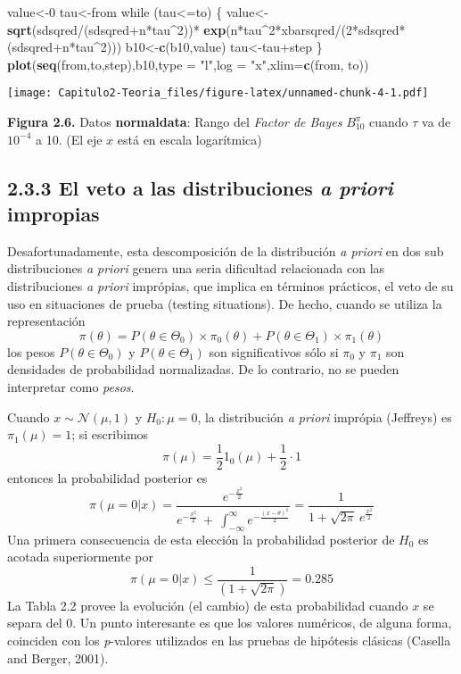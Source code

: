 \documentclass[12pt,]{article}
\newenvironment{Shaded}{\begin{snugshade}}{\end{snugshade}}
\newcommand{\KeywordTok}[1]{\textcolor[rgb]{0.13,0.29,0.53}{\textbf{{#1}}}}
\newcommand{\DataTypeTok}[1]{\textcolor[rgb]{0.13,0.29,0.53}{{#1}}}
\newcommand{\DecValTok}[1]{\textcolor[rgb]{0.00,0.00,0.81}{{#1}}}
\newcommand{\StringTok}[1]{\textcolor[rgb]{0.31,0.60,0.02}{{#1}}}
\newcommand{\NormalTok}[1]{{#1}}
\begin{document}
\begin{Shaded}
\begin{Highlighting}[]
\NormalTok{value<-}\DecValTok{0}
\NormalTok{tau<-from}
\NormalTok{while (tau<=to) \{}
  \NormalTok{value<-}\KeywordTok{sqrt}\NormalTok{(sdsqred/(sdsqred+n*tau^}\DecValTok{2}\NormalTok{))*}
\StringTok{    }\KeywordTok{exp}\NormalTok{(n*tau^}\DecValTok{2}\NormalTok{*xbarsqred/(}\DecValTok{2}\NormalTok{*sdsqred*(sdsqred+n*tau^}\DecValTok{2}\NormalTok{)))}
  \NormalTok{b10<-}\KeywordTok{c}\NormalTok{(b10,value)}
  \NormalTok{tau<-tau+step}
\NormalTok{\}}
\KeywordTok{plot}\NormalTok{(}\KeywordTok{seq}\NormalTok{(from,to,step),b10,}\DataTypeTok{type =} \StringTok{"l"}\NormalTok{,}\DataTypeTok{log =} \StringTok{"x"}\NormalTok{,}\DataTypeTok{xlim=}\KeywordTok{c}\NormalTok{(from, to))}
\end{Highlighting}
\end{Shaded}

\texttt{[image: Capitulo2-Teoria\_files/figure-latex/unnamed-chunk-4-1.pdf]}

\textbf{Figura 2.6.} Datos \textbf{normaldata}: Rango del \emph{Factor
de Bayes} \(B_{10}^\pi\) cuando \(\tau\) va de \(10^{-4}\) a 10. (El eje
\(x\) está en escala logarítmica)

\subsection{\texorpdfstring{2.3.3 El veto a las distribuciones \emph{a
priori}
impropias}{2.3.3 El veto a las distribuciones a priori impropias}}\label{el-veto-a-las-distribuciones-a-priori-impropias}

Desafortunadamente, esta descomposición de la distribución \emph{a
priori} en dos sub distribuciones \emph{a priori} genera una seria
dificultad relacionada con las distribuciones \emph{a priori} imprópias,
que implica en términos prácticos, el veto de su uso en situaciones de
prueba (testing situations). De hecho, cuando se utiliza la
representación \[
\pi(\theta)=P(\theta\in\Theta_0)\times\pi_0(\theta)+P(\theta\in\Theta_1)\times\pi_1(\theta)
\] los pesos \(P(\theta\in\Theta_0)\) y \(P(\theta\in\Theta_1)\) son
significativos sólo si \(\pi_0\) y \(\pi_1\) son densidades de
probabilidad normalizadas. De lo contrario, no se pueden interpretar
como \emph{pesos}.

Cuando \(x\sim\mathcal{N}(\mu,1)\) y \(H_0:\mu=0\), la distribución
\emph{a priori} imprópia (Jeffreys) es \(\pi_1(\mu)=1\); si escribimos
\[
\pi(\mu)=\frac{1}{2} 1_{0}(\mu)+\frac{1}{2} \cdotp 1
\] entonces la probabilidad posterior es \[
\pi(\mu=0|x)=  \frac{\displaystyle e^{-\frac{x^2}{2}}}{e^{-\frac{x^2}{2}}\ +\ \displaystyle \int_{-\infty}^{\infty}e^{-\frac{(x-\theta)^2}{2}}}=\frac{1}{1+\sqrt{2\pi}\ e^{\frac{x^2}{2}}}
\] Una primera consecuencia de esta elección la probabilidad posterior
de \(H_0\) es acotada superiormente por \[
\pi(\mu=0|x)\le\frac{1}{(1+\sqrt{2\pi})}=0.285
\] La Tabla 2.2 provee la evolución (el cambio) de esta probabilidad
cuando \(x\) se separa del \(0\). Un punto interesante es que los
valores numéricos, de alguna forma, coinciden con los \emph{p}-valores
utilizados en las pruebas de hipótesis clásicas (Casella and Berger,
2001).
\end{document}
